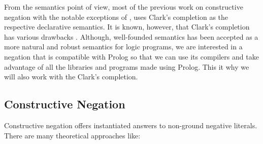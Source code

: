 \documentclass{tlp}
\begin{document}
From the semantics point of view, most of the previous work on constructive
negation with the notable exceptions of \cite{Damasio,Drabent,Przymusinski2},
uses Clark's completion as the respective declarative semantics. It is known,
however, that Clark's completion has various drawbacks
\cite{Przymusinski3}. Although, well-founded semantics \cite{VGelder} has been
accepted as a more natural and robust semantics for logic programs, we are
interested in a negation that is compatible with Prolog so that we can use its
compilers and take advantage of all the libraries and programs made using
Prolog. This it why we will also work with the Clark's completion.

\subsection{Constructive Negation}

Constructive negation offers instantiated answers to non-ground negative
literals. There are many theoretical approaches like:
\end{document}

